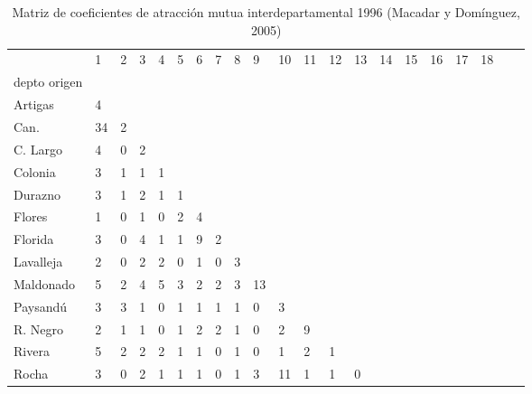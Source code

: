 \begin{table}
\centering
\caption{Matriz de coeficientes de atracción mutua interdepartamental 1996 (Macadar y Domínguez, 2005)}
\begin{tabular}{lp{0.4cm}p{0.4cm}p{0.4cm}p{0.4cm}p{0.4cm}p{0.4cm}p{0.4cm}p{0.4cm}p{0.4cm}p{0.4cm}p{0.4cm}p{0.4cm}p{0.4cm}p{0.4cm}p{0.4cm}p{0.4cm}p{0.4cm}p{0.4cm}p{0.4cm}p{0.4cm}}
\toprule
{} &   1 &  2 &  3 &  4 &  5 &  6 &  7 &  8 &  9 &  10 &  11 &  12 &  13 &  14 &  15 &  16 &  17 &  18 \\
depto origen &     &    &    &    &    &    &    &    &    &     &     &     &     &     &     &     &     &     \\
\midrule
Artigas      &   4 &    &    &    &    &    &    &    &    &     &     &     &     &     &     &     &     &     \\
Can.         &  34 &  2 &    &    &    &    &    &    &    &     &     &     &     &     &     &     &     &     \\
C. Largo     &   4 &  0 &  2 &    &    &    &    &    &    &     &     &     &     &     &     &     &     &     \\
Colonia      &   3 &  1 &  1 &  1 &    &    &    &    &    &     &     &     &     &     &     &     &     &     \\
Durazno      &   3 &  1 &  2 &  1 &  1 &    &    &    &    &     &     &     &     &     &     &     &     &     \\
Flores       &   1 &  0 &  1 &  0 &  2 &  4 &    &    &    &     &     &     &     &     &     &     &     &     \\
Florida      &   3 &  0 &  4 &  1 &  1 &  9 &  2 &    &    &     &     &     &     &     &     &     &     &     \\
Lavalleja    &   2 &  0 &  2 &  2 &  0 &  1 &  0 &  3 &    &     &     &     &     &     &     &     &     &     \\
Maldonado    &   5 &  2 &  4 &  5 &  3 &  2 &  2 &  3 & 13 &     &     &     &     &     &     &     &     &     \\
Paysandú     &   3 &  3 &  1 &  0 &  1 &  1 &  1 &  1 &  0 &   3 &     &     &     &     &     &     &     &     \\
R. Negro     &   2 &  1 &  1 &  0 &  1 &  2 &  2 &  1 &  0 &   2 &   9 &     &     &     &     &     &     &     \\
Rivera       &   5 &  2 &  2 &  2 &  1 &  1 &  0 &  1 &  0 &   1 &   2 &   1 &     &     &     &     &     &     \\
Rocha        &   3 &  0 &  2 &  1 &  1 &  1 &  0 &  1 &  3 &  11 &   1 &   1 &   0 &     &     &     &     &     \\

\end{tabular}
\end{table}
